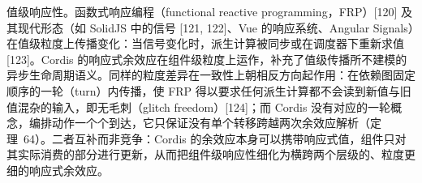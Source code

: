值级响应性。函数式响应编程（functional reactive programming，FRP）{[}120{]} 及其现代形态（如 SolidJS 中的信号 {[}121, 122{]}、Vue 的响应系统、Angular Signals）在值级粒度上传播变化：当信号变化时，派生计算被同步或在调度器下重新求值 {[}123{]}。Cordis 的响应式余效应在组件级粒度上运作，补充了值级传播所不建模的异步生命周期语义。同样的粒度差异在一致性上朝相反方向起作用：在依赖图固定顺序的一轮（turn）内传播，使 FRP 得以要求任何派生计算都不会读到新值与旧值混杂的输入，即无毛刺（glitch freedom）{[}124{]}；而 Cordis 没有对应的一轮概念，编排动作一个个到达，它只保证没有单个转移跨越两次余效应解析（定理~64）。二者互补而非竞争：Cordis 的余效应本身可以携带响应式值，组件只对其实际消费的部分进行更新，从而把组件级响应性细化为横跨两个层级的、粒度更细的响应式余效应。
